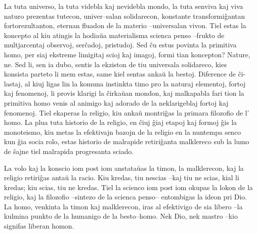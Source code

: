 La tuta universo, la tuta videbla kaj nevidebla mondo, la tuta senviva kaj viva naturo prezentas tutecon, univer–salan solidarecon, konstante transformiĝantan fortorezultanton, eternan fluadon de la materio –universalan vivon. Tiel estas la koncepto al kiu atingis la hodiaŭa materialisma scienca penso –frukto de multjarcentaj observoj, serĉadoj, pristudoj. Sed ĉu estus povinta la primitiva homo, per siaj ekstreme limigitaj scioj kaj imagoj, formi tian koncepton? Nature, ne. Sed li, sen ia dubo, sentis la ekziston de tiu universala solidareco, kies konsista parteto li mem estas, same kiel sentas ankaŭ la bestoj. Diference de ĉi-lastaj, al kiuj ligas lin la komuna instinkta timo pro la naturaj elementoj, fortoj kaj fenomenoj, li provis klarigi la ĉirkaŭan mondon, kaj malkapabla fari tion la primitiva homo venis al animigo kaj adorado de la neklarigeblaj fortoj kaj fenomenoj. Tiel ekaperas la religio, kiu ankaŭ montriĝas la primara filozofio de l’ homo. La plua tuta historio de la religio, en ĉiuj ĝiaj etapoj kaj formoj ĝis la monoteismo, kiu metas la efektivajn bazojn de la religio en la nuntempa senco kun ĝia socia rolo, estas historio de malrapide retiriĝanta malklereco sub la lumo de ŝajne tiel malrapida progresanta sciado.

La volo kaj la konscio iom post iom anstataŭas la timon, la malklerecon, kaj la religio retiriĝas antaŭ la racio. Kiu kredas, tiu nescias –kaj tiu ne scias, kial li kredas; kiu scias, tiu ne kredas. Tiel la scienco iom post iom okupas la lokon de la religio, kaj la filozofio –sintezo de la scienca penso– entombigas la ideon pri Dio. La homo, venkinta la timon kaj malklerecon, iras al efektivigo de sia libero –la kulmina punkto de la humanigo de la besto–homo. Nek Dio, nek mastro –kio signifas liberan homon.